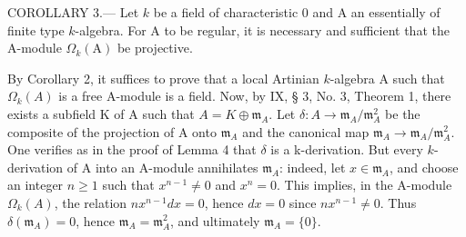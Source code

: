 COROLLARY 3.--- Let \(k\) be a field of characteristic 0 and A an essentially of finite type \(k\)-algebra. For A to be regular, it is necessary and sufficient that the A-module \(\Omega_{k}(\mathrm{A})\) be projective.

By Corollary 2, it suffices to prove that a local Artinian \(k\)-algebra A such that \(\Omega_k(A)\) is a free A-module is a field. Now, by IX, § 3, No. 3, Theorem 1, there exists a subfield K of A such that \(A = K \oplus \mathfrak{m}_A\). Let \(\delta: A \to \mathfrak{m}_A / \mathfrak{m}_A^2\) be the composite of the projection of A onto \(\mathfrak{m}_A\) and the canonical map \(\mathfrak{m}_A \to \mathfrak{m}_A / \mathfrak{m}_A^2\). One verifies as in the proof of Lemma 4 that \(\delta\) is a k-derivation. But every \(k\)-derivation of A into an A-module annihilates \(\mathfrak{m}_A\): indeed, let \(x \in \mathfrak{m}_A\), and choose an integer \(n \geqslant 1\) such that \(x^{n-1} \neq 0\) and \(x^n = 0\). This implies, in the A-module \(\Omega_k(A)\), the relation \(nx^{n-1} dx = 0\), hence \(dx = 0\) since \(nx^{n-1} \neq 0\). Thus \(\delta(\mathfrak{m}_A) = 0\), hence \(\mathfrak{m}_A = \mathfrak{m}_A^2\), and ultimately \(\mathfrak{m}_A = \{0\}\).

